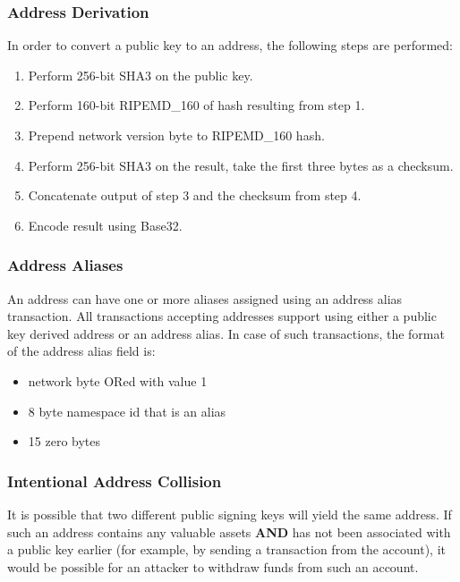 \subsubsection{Address Derivation}
In order to convert a public key to an address, the following steps are performed:
\begin{enumerate}
	\item{Perform 256-bit SHA3 on the public key.}
	\item{Perform 160-bit RIPEMD\_160 of hash resulting from step 1.}
	\item{Prepend network version byte to RIPEMD\_160 hash.}
	\item{Perform 256-bit SHA3 on the result, take the first three bytes as a checksum.}
	\item{Concatenate output of step 3 and the checksum from step 4.}
	\item{Encode result using Base32.}
\end{enumerate}

\begin{figure}
\end{figure}

\pagebreak

\subsubsection{Address Aliases}
An address can have one or more aliases assigned using an address alias transaction.
All transactions accepting addresses support using either a public key derived address or an address alias.
In case of such transactions, the format of the address alias field is:
\begin{itemize}
	\item{network byte ORed with value 1}
	\item{8 byte namespace id that is an alias}
	\item{15 zero bytes}
\end{itemize}

\subsubsection{Intentional Address Collision}
It is possible that two different public signing keys will yield the same address.
If such an address contains any valuable assets \textbf{AND} has not been associated with a public key earlier (for example, by sending a transaction from the account), it would be possible for an attacker to withdraw funds from such an account.

